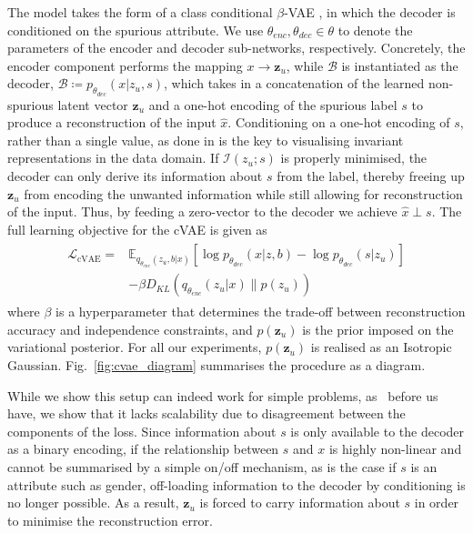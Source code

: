 The model takes the form of a class conditional $\beta$-VAE \citep{higgins2017beta}, in which the decoder is conditioned on the spurious attribute.
We use $\theta_{enc}, \theta_{dec} \in \theta$ to denote the parameters of the encoder and decoder sub-networks, respectively.
Concretely, the encoder component performs the mapping $x \rightarrow{\bm{z}_u}$, while $\mathcal{B}$ is instantiated as the decoder,
$\mathcal{B} \coloneqq p_{\theta_{dec}}(x|z_u, s)$, which takes in a concatenation of the learned non-spurious latent vector $\bm{z}_u$ and a one-hot encoding of the spurious label $s$ to produce a reconstruction of the input $\hat{x}$.
Conditioning on a one-hot encoding of $s$, rather than a single value, as done in \citet{madras2018learning} is the key to visualising invariant representations in the data domain.
If $\mathcal{I}(z_u; s)$ is properly minimised, the decoder can only derive its information about $s$ from the label, thereby freeing up $\bm{z}_u$ from encoding the unwanted information while still allowing for reconstruction of the input.
Thus, by feeding a zero-vector to the decoder we achieve $\hat{x} \perp s$.
The full learning objective for the cVAE is given as
\begin{align}
\begin{split}
    \mathcal{L}_{\mathrm{cVAE}} =& \mathbb{E}_{q_{\theta_{enc}}(z_u, b|x)}[\log p_{\theta_{dec}}(x|z, b) - \log p_{\theta_{dec}}(s|z_u)] \\ 
    &- \beta D_{KL}(q_{\theta_{enc}}(z_u |x) \| p(z_u))
\end{split}
\end{align}
where $\beta$ is a hyperparameter that determines the trade-off between reconstruction accuracy and independence constraints,
and $p(\bm{z}_u)$ is the prior imposed on the variational posterior.
For all our experiments, $p(\bm{z}_u)$ is realised as an Isotropic Gaussian.
Fig.~\ref{fig:cvae_diagram} summarises the procedure as a diagram.

While we show this setup can indeed work for simple problems, as~\citet{madras2018learning} before us have, we show that it lacks scalability due to disagreement between the components of the loss.
Since information about $s$ is only available to the decoder as a binary encoding,
if the relationship between $s$ and $x$ is highly non-linear and cannot be summarised by a simple on/off mechanism, as is the case if $s$ is an attribute such as gender,
off-loading information to the decoder by conditioning is no longer possible. As a result, $\bm{z}_u$ is forced to carry information about $s$ in order to minimise the reconstruction error. 

